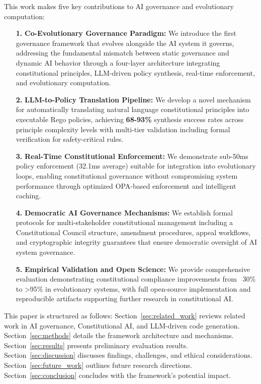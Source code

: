 \documentclass[sigconf,natbib]{acmart}
\begin{document}
This work makes five key contributions to AI governance and evolutionary computation:
\begin{itemize}
    \item[\textbf{1.}] \textbf{Co-Evolutionary Governance Paradigm:} We introduce the first governance framework that evolves alongside the AI system it governs, addressing the fundamental mismatch between static governance and dynamic AI behavior through a four-layer architecture integrating constitutional principles, LLM-driven policy synthesis, real-time enforcement, and evolutionary computation.
    \item[\textbf{2.}] \textbf{LLM-to-Policy Translation Pipeline:} We develop a novel mechanism for automatically translating natural language constitutional principles into executable Rego policies, achieving \textbf{68-93\%} synthesis success rates across principle complexity levels with multi-tier validation including formal verification for safety-critical rules.
    \item[\textbf{3.}] \textbf{Real-Time Constitutional Enforcement:} We demonstrate sub-50ms policy enforcement (32.1ms average) suitable for integration into evolutionary loops, enabling constitutional governance without compromising system performance through optimized OPA-based enforcement and intelligent caching.
    \item[\textbf{4.}] \textbf{Democratic AI Governance Mechanisms:} We establish formal protocols for multi-stakeholder constitutional management including a Constitutional Council structure, amendment procedures, appeal workflows, and cryptographic integrity guarantees that ensure democratic oversight of AI system governance.
    \item[\textbf{5.}] \textbf{Empirical Validation and Open Science:} We provide comprehensive evaluation demonstrating constitutional compliance improvements from ~30\% to >95\% in evolutionary systems, with full open-source implementation and reproducible artifacts supporting further research in constitutional AI.
\end{itemize}

This paper is structured as follows: Section~\ref{sec:related_work} reviews related work in AI governance, Constitutional AI, and LLM-driven code generation. Section~\ref{sec:methods} details the framework architecture and mechanisms. Section~\ref{sec:results} presents preliminary evaluation results. Section~\ref{sec:discussion} discusses findings, challenges, and ethical considerations. Section~\ref{sec:future_work} outlines future research directions. Section~\ref{sec:conclusion} concludes with the framework's potential impact.
\end{document}
